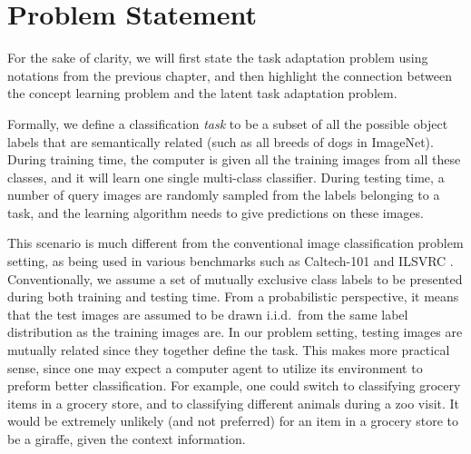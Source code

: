 
\section{Problem Statement}\label{sec:adaptation:model}
For the sake of clarity, we will first state the task adaptation problem using notations from the previous chapter, and then highlight the connection between the concept learning problem and the latent task adaptation problem.

Formally, we define a classification \emph{task} to be a subset of all the possible object labels that are semantically related (such as all breeds of dogs in ImageNet). During training time, the computer is given all the training images from all these classes, and it will learn one single multi-class classifier. During testing time, a number of query images are randomly sampled from the labels belonging to a task, and the learning algorithm needs to give predictions on these images.

This scenario is much different from the conventional image classification problem setting, as being used in various benchmarks such as Caltech-101 \cite{fei2006one} and ILSVRC \cite{ilsvrc10}. Conventionally, we assume a set of mutually exclusive class labels to be presented during both training and testing time. From a probabilistic perspective, it means that the test images are assumed to be drawn i.i.d.\ from the same label distribution as the training images are. In our problem setting, testing images are mutually related since they together define the task. This makes more practical sense, since one may expect a computer agent to utilize its environment to preform better classification. For example, one could switch to classifying grocery items in a grocery store, and to classifying different animals during a zoo visit. It would be extremely unlikely (and not preferred) for an item in a grocery store to be a giraffe, given the context information.

